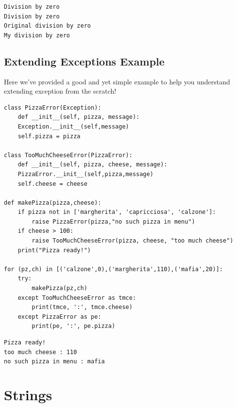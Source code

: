 \documentclass[11pt]{article}
\begin{document}
\begin{verbatim}
Division by zero
Division by zero
Original division by zero
My division by zero
\end{verbatim}

\newpage
\subsection{Extending Exceptions Example}
\label{sec:org369675d}
Here we've provided a good and yet simple example to help you
understand extending exception from the scratch!

\begin{verbatim}
class PizzaError(Exception):
    def __init__(self, pizza, message):
	Exception.__init__(self,message)
	self.pizza = pizza

class TooMuchCheeseError(PizzaError):
    def __init__(self, pizza, cheese, message):
	PizzaError.__init__(self,pizza,message)
	self.cheese = cheese

def makePizza(pizza,cheese):
	if pizza not in ['margherita', 'capricciosa', 'calzone']:
		raise PizzaError(pizza,"no such pizza in menu")
	if cheese > 100:
		raise TooMuchCheeseError(pizza, cheese, "too much cheese")
	print("Pizza ready!")

for (pz,ch) in [('calzone',0),('margherita',110),('mafia',20)]:
	try:
		makePizza(pz,ch)
	except TooMuchCheeseError as tmce:
		print(tmce, ':', tmce.cheese)
	except PizzaError as pe:
		print(pe, ':', pe.pizza)
\end{verbatim}

\begin{verbatim}
Pizza ready!
too much cheese : 110
no such pizza in menu : mafia
\end{verbatim}

\newpage

\section{Strings}
\label{sec:org978b6de}
\end{document}
